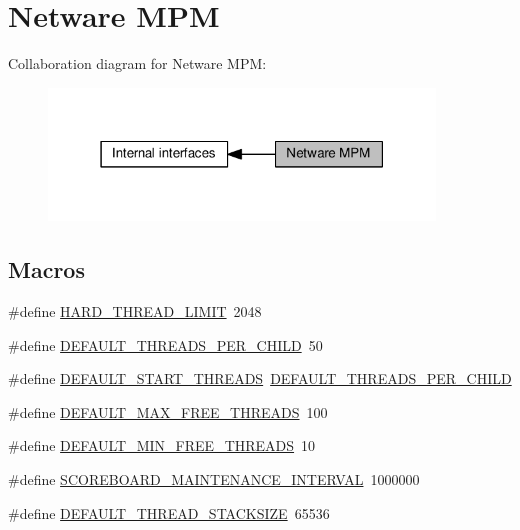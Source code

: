 \hypertarget{group__APACHE__MPM__NETWARE}{}\section{Netware M\+PM}
\label{group__APACHE__MPM__NETWARE}
Collaboration diagram for Netware M\+PM\+:
\nopagebreak
\begin{figure}[H]
\begin{center}
\leavevmode
\includegraphics[width=291pt]{group__APACHE__MPM__NETWARE}
\end{center}
\end{figure}
\subsection*{Macros}
\begin{DoxyCompactItemize}
\item 
\#define \hyperlink{group__APACHE__MPM__NETWARE_gacd4caf27098c6207ccb7103d0862ccc1}{H\+A\+R\+D\+\_\+\+T\+H\+R\+E\+A\+D\+\_\+\+L\+I\+M\+IT}~2048
\item 
\#define \hyperlink{group__APACHE__MPM__NETWARE_gaf3e2d0fe4c45aac538a61bf99d69a378}{D\+E\+F\+A\+U\+L\+T\+\_\+\+T\+H\+R\+E\+A\+D\+S\+\_\+\+P\+E\+R\+\_\+\+C\+H\+I\+LD}~50
\item 
\#define \hyperlink{group__APACHE__MPM__NETWARE_ga83d1779980d3198e3132deefddefb921}{D\+E\+F\+A\+U\+L\+T\+\_\+\+S\+T\+A\+R\+T\+\_\+\+T\+H\+R\+E\+A\+DS}~\hyperlink{group__APACHE__MPM__WORKER_gaf3e2d0fe4c45aac538a61bf99d69a378}{D\+E\+F\+A\+U\+L\+T\+\_\+\+T\+H\+R\+E\+A\+D\+S\+\_\+\+P\+E\+R\+\_\+\+C\+H\+I\+LD}
\item 
\#define \hyperlink{group__APACHE__MPM__NETWARE_gadb44a5bf611f1891427b4433224c478c}{D\+E\+F\+A\+U\+L\+T\+\_\+\+M\+A\+X\+\_\+\+F\+R\+E\+E\+\_\+\+T\+H\+R\+E\+A\+DS}~100
\item 
\#define \hyperlink{group__APACHE__MPM__NETWARE_gafac620bf4ef2ad6657fd8301f1a04dc4}{D\+E\+F\+A\+U\+L\+T\+\_\+\+M\+I\+N\+\_\+\+F\+R\+E\+E\+\_\+\+T\+H\+R\+E\+A\+DS}~10
\item 
\#define \hyperlink{group__APACHE__MPM__NETWARE_gaff56963e5ad1fd30007bf7a53b721939}{S\+C\+O\+R\+E\+B\+O\+A\+R\+D\+\_\+\+M\+A\+I\+N\+T\+E\+N\+A\+N\+C\+E\+\_\+\+I\+N\+T\+E\+R\+V\+AL}~1000000
\item 
\#define \hyperlink{group__APACHE__MPM__NETWARE_ga7f93dfeaed4021061959f822def602cb}{D\+E\+F\+A\+U\+L\+T\+\_\+\+T\+H\+R\+E\+A\+D\+\_\+\+S\+T\+A\+C\+K\+S\+I\+ZE}~65536
\end{DoxyCompactItemize}


